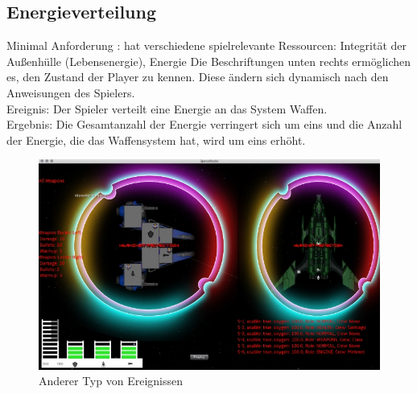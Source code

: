 \documentclass[12pt]{article}
\begin{document}
\newpage
\subsection{Energieverteilung}
Minimal Anforderung : hat verschiedene spielrelevante Ressourcen: Integrität der Außenhülle (Lebensenergie), Energie
Die Beschriftungen unten rechts ermöglichen es, den Zustand der Player zu kennen. Diese ändern sich dynamisch nach den Anweisungen des Spielers.\\
Ereignis: Der Spieler verteilt eine Energie an das System Waffen.\\
Ergebnis: Die Gesamtanzahl der Energie verringert sich um eins und die Anzahl der Energie, die das Waffensystem hat, wird um eins erhöht.\\
\begin{figure}[htp]
\centering
\includegraphics[scale=0.7]{TestProtocolBilder/OptimizedEnergieAlleSysteme.png}
\caption{Anderer Typ von Ereignissen}
\end{figure}

\newpage
\end{document}
